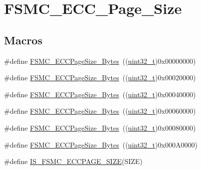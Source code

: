 \hypertarget{group___f_s_m_c___e_c_c___page___size}{}\section{F\+S\+M\+C\+\_\+\+E\+C\+C\+\_\+\+Page\+\_\+\+Size}
\label{group___f_s_m_c___e_c_c___page___size}
\subsection*{Macros}
\begin{DoxyCompactItemize}
\item 
\#define \hyperlink{group___f_s_m_c___e_c_c___page___size_gaaa1661267b44e6728fa64aca79de54b3}{F\+S\+M\+C\+\_\+\+E\+C\+C\+Page\+Size\+\_\+Bytes}~((\hyperlink{_p_e___types_8h_a33594304e786b158f3fb30289278f5af}{uint32\+\_\+t})0x00000000)
\item 
\#define \hyperlink{group___f_s_m_c___e_c_c___page___size_gacb4da17c28dde89e38ff4ed40497f6b5}{F\+S\+M\+C\+\_\+\+E\+C\+C\+Page\+Size\+\_\+Bytes}~((\hyperlink{_p_e___types_8h_a33594304e786b158f3fb30289278f5af}{uint32\+\_\+t})0x00020000)
\item 
\#define \hyperlink{group___f_s_m_c___e_c_c___page___size_ga8137931c96b63ec7e6f80a8c7391433f}{F\+S\+M\+C\+\_\+\+E\+C\+C\+Page\+Size\+\_\+Bytes}~((\hyperlink{_p_e___types_8h_a33594304e786b158f3fb30289278f5af}{uint32\+\_\+t})0x00040000)
\item 
\#define \hyperlink{group___f_s_m_c___e_c_c___page___size_gab8f3ae95becd59e71a976b97ded904b8}{F\+S\+M\+C\+\_\+\+E\+C\+C\+Page\+Size\+\_\+Bytes}~((\hyperlink{_p_e___types_8h_a33594304e786b158f3fb30289278f5af}{uint32\+\_\+t})0x00060000)
\item 
\#define \hyperlink{group___f_s_m_c___e_c_c___page___size_gaec2e9e434685a1756bd171699248f65a}{F\+S\+M\+C\+\_\+\+E\+C\+C\+Page\+Size\+\_\+Bytes}~((\hyperlink{_p_e___types_8h_a33594304e786b158f3fb30289278f5af}{uint32\+\_\+t})0x00080000)
\item 
\#define \hyperlink{group___f_s_m_c___e_c_c___page___size_gab6877a99ddf02e7aa95cf04896ce731d}{F\+S\+M\+C\+\_\+\+E\+C\+C\+Page\+Size\+\_\+Bytes}~((\hyperlink{_p_e___types_8h_a33594304e786b158f3fb30289278f5af}{uint32\+\_\+t})0x000\+A0000)
\item 
\#define \hyperlink{group___f_s_m_c___e_c_c___page___size_ga58fefa0d55875775a88f54ad7498178f}{I\+S\+\_\+\+F\+S\+M\+C\+\_\+\+E\+C\+C\+P\+A\+G\+E\+\_\+\+S\+I\+ZE}(S\+I\+ZE)

\end{DoxyCompactItemize}
